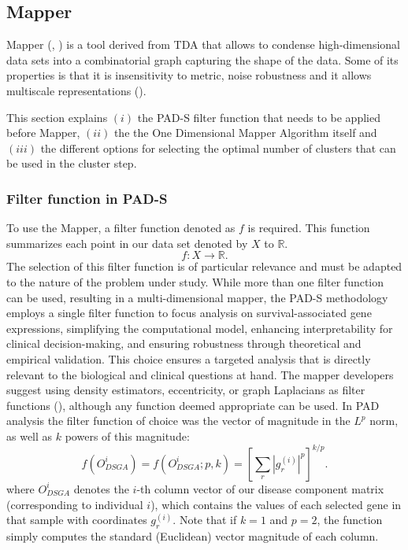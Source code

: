 \hypertarget{section2.3}{%
\subsection{Mapper}\label{section2.3}}

Mapper (\citet{singh2007topological}, \citet{lum2013extracting}) is a tool derived from TDA that allows to condense high-dimensional data sets into a combinatorial graph capturing the shape of the data. Some of its properties is that it is insensitivity to metric, noise robustness and it allows multiscale representations (\citet{carlsson2009topology}).

This section explains \((i)\) the PAD-S filter function that needs to be applied before Mapper, \((ii)\) the the One Dimensional Mapper Algorithm itself and \((iii)\) the different options for selecting the optimal number of clusters that can be used in the cluster step.

\hypertarget{section2.3.1}{%
\subsubsection{Filter function in PAD-S}\label{section2.3.1}}

To use the Mapper, a filter function denoted as \(f\) is required. This function summarizes each point in our data set denoted by \(X\) to \(\mathbb{R}\). \[f: X \rightarrow \mathbb{R}.\] The selection of this filter function is of particular relevance and must be adapted to the nature of the problem under study. While more than one filter function can be used, resulting in a multi-dimensional mapper, the PAD-S methodology employs a single filter function to focus analysis on survival-associated gene expressions, simplifying the computational model, enhancing interpretability for clinical decision-making, and ensuring robustness through theoretical and empirical validation. This choice ensures a targeted analysis that is directly relevant to the biological and clinical questions at hand. The mapper developers suggest using density estimators, eccentricity, or graph Laplacians as filter functions (\citet{singh2007topological}), although any function deemed appropriate can be used. In PAD analysis the filter function of choice was the vector of magnitude in the \(L^p\) norm, as well as \(k\) powers of this magnitude:
\[f(O_{DSGA}^i) = f(O_{DSGA}^i;p,k) = \left[\sum_r |g_{r}^{(i)}|^p \right]^{k/p}.\]
where \(O_{DSGA}^i\) denotes the \(i\)-th column vector of our disease component matrix (corresponding to individual \(i\)), which contains the values of each selected gene in that sample with coordinates \(g_r^{(i)}.\) Note that if \(k = 1\) and \(p = 2\), the function simply computes the standard (Euclidean) vector magnitude of each column.

